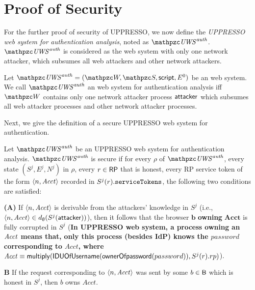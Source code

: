   
  
\section{Proof of Security}
For the further proof of security of UPPRESSO, we now define the \emph{UPPRESSO web system for authentication analysis}, noted as $\mi{\uppressoauthwebsystem}$.  $\mi{\uppressoauthwebsystem}$ is considered as the \uppresso web system with only one network attacker, which subsumes all web attackers and other network attackers.  
  
  
  \begin{definition}
    Let $\mi{\uppressoauthwebsystem} = (\bidsystem, \scriptset, \mathsf{script}, E^0)$ be
    an \uppresso web system. We call $\mi{\uppressoauthwebsystem}$ an
    \uppresso web system for authentication analysis iff
    $\bidsystem$ contains only one network attacker process
    $\mathsf{attacker}$ which subsumes all web attacker processes and other network attacker processes.
  \end{definition}
  
  
  Next, we give the definition of a secure UPPRESSO web system for authentication. 
  
  \begin{definition}
  Let $\mi{\uppressoauthwebsystem}$ be an UPPRESSO web system for authentication analysis. $\mi{\uppressoauthwebsystem}$ is secure if for every $\rho$ of $\mi{\uppressoauthwebsystem}$, every state $(S^j, E^j, N^j)$ in $\rho$, every $r\in \mathsf{RP}$ that is honest, every RP service token of the form $\langle n, \mathit{Acct}\rangle$ recorded in  $S^j(r).\mathtt{serviceTokens}$, the following two conditions are satisfied:
   
   \textbf{(A)} If $\langle n,\mathit{Acct}\rangle$ is derivable from the attackers' knowledge in $S^j$ (i.e., $\langle n,\mathit{Acct}\rangle \in d_{\emptyset}(S^j(\mathsf{attacker}))$), then it follows that the browser $\boldsymbol{b}$ \textbf{owning} $\boldsymbol{Acct}$ is fully corrupted in $S^j$ (\textbf{In UPPRESSO web system, a process owning an $\mathit{Acct}$ means that, only this process (besides IdP) knows the $password$ corresponding to $Acct$, where $\mathit{Acct} \equiv \mathsf{multiply}(\mathsf{IDUOfUsername} (\mathsf{ownerOfpassword}(password)), S^j(r).rp)$}).
   
   \textbf{{B}} If the request corresponding to $\langle n,\mathit{Acct}\rangle$ was sent by  some $b\in \mathsf{B}$ which is honest in $S^j$, then $b$ owns $Acct$.
  \end{definition}

